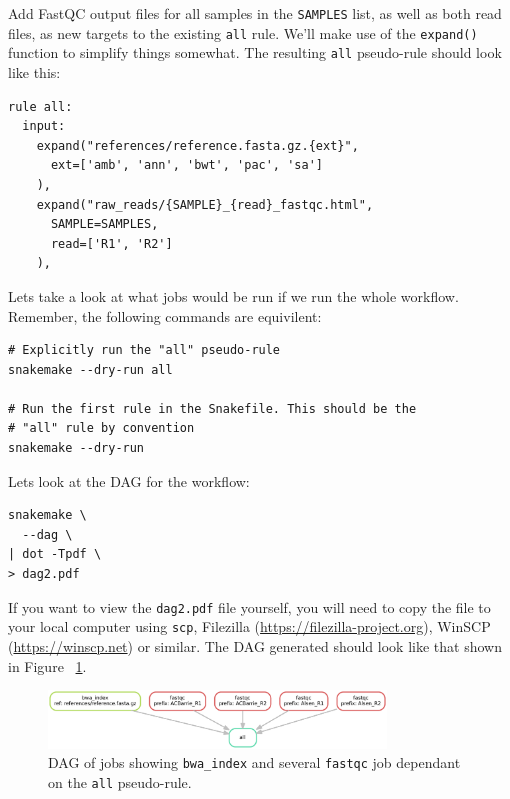 Add FastQC output files for all samples in the \texttt{SAMPLES} list, as well as both read files, as new targets to the existing \texttt{all} rule.
We'll make use of the \texttt{expand()} function to simplify things somewhat.
The resulting \texttt{all} pseudo-rule should look like this:

\begin{lstlisting}
rule all:
  input:
    expand("references/reference.fasta.gz.{ext}",
      ext=['amb', 'ann', 'bwt', 'pac', 'sa']
    ),
    expand("raw_reads/{SAMPLE}_{read}_fastqc.html",
      SAMPLE=SAMPLES,
      read=['R1', 'R2']
    ),
\end{lstlisting}

Lets take a look at what jobs would be run if we run the whole workflow.
Remember, the following commands are equivilent:

\begin{lstlisting}
# Explicitly run the "all" pseudo-rule
snakemake --dry-run all

# Run the first rule in the Snakefile. This should be the
# "all" rule by convention
snakemake --dry-run
\end{lstlisting}

Lets look at the DAG for the workflow:

\begin{lstlisting}
snakemake \
  --dag \
| dot -Tpdf \
> dag2.pdf
\end{lstlisting}

\begin{warning}

If you want to view the \texttt{dag2.pdf} file yourself, you will need to copy the file to your local computer using \texttt{scp}, Filezilla (\url{https://filezilla-project.org}), WinSCP (\url{https://winscp.net}) or similar.
The DAG generated should look like that shown in Figure ~\ref{fig:dag2}.

\end{warning}

\begin{figure}[H]
\centering
\includegraphics[width=0.8\textwidth]{handout/dag2.pdf}
\caption{DAG of jobs showing \texttt{bwa\_index} and several \texttt{fastqc} job dependant on the \texttt{all} pseudo-rule.}
\label{fig:dag2}
\end{figure}


